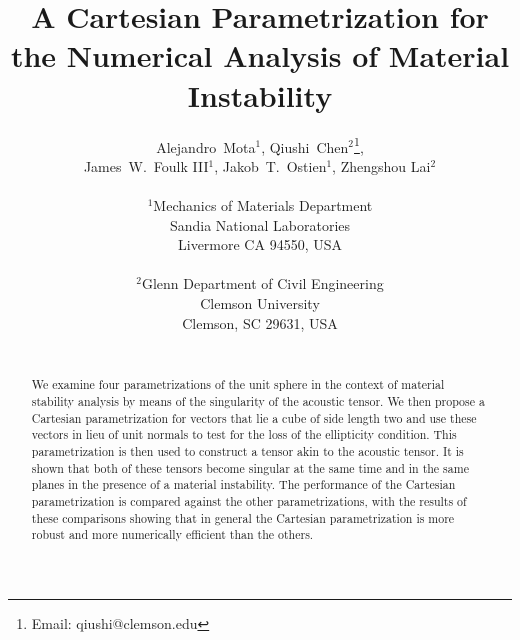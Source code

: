 \documentclass[12pt]{article}
\numberwithin{equation}{section}
\begin{document}





\title{A Cartesian Parametrization for the Numerical Analysis of
  Material Instability}

\author{
  \Large Alejandro~Mota$^1$,
  Qiushi~Chen$^2$\thanks{Email: qiushi@clemson.edu},
  \\
  \Large James~W.~Foulk {III}$^1$,
  Jakob~T.~Ostien$^1$, Zhengshou Lai$^2$
  \\
  \\
  $^1$Mechanics of Materials Department\\
  Sandia National Laboratories
  \\
  Livermore CA 94550, USA\\
  \\
  $^2$Glenn Department of Civil Engineering\\
  Clemson University
  \\
  Clemson, SC 29631, USA
  \\
  \\
}

\date{}

\maketitle

\linenumbers

\begin{abstract}
  We examine four parametrizations of the unit sphere in the context
  of material stability analysis by means of the singularity of the
  acoustic tensor. We then propose a Cartesian parametrization for
  vectors that lie a cube of side length two and use these vectors in
  lieu of unit normals to test for the loss of the ellipticity
  condition. This parametrization is then used to construct a tensor
  akin to the acoustic tensor. It is shown that both of these tensors
  become singular at the same time and in the same planes in the
  presence of a material instability. The performance of the Cartesian
  parametrization is compared against the other parametrizations, with
  the results of these comparisons showing that in general the
  Cartesian parametrization is more robust and more numerically
  efficient than the others.
\end{abstract}
\end{document}
